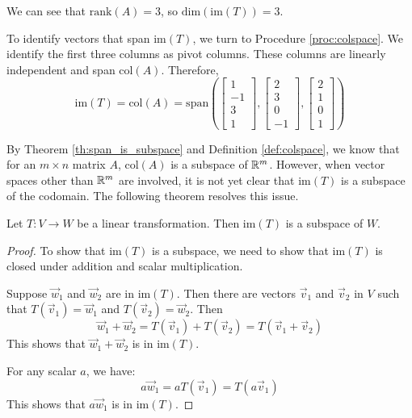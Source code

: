 \documentclass{ximera}
\begin{document}
\begin{example}
\begin{explanation}
We can see that $\mbox{rank}(A)=3$, so $\mbox{dim}(\mbox{im}(T))=3$. 
 
To identify vectors that span $\mbox{im}(T)$, we turn to Procedure \ref{proc:colspace}.  We identify the first three columns as pivot columns.  These columns are linearly independent and span $\mbox{col}(A)$.  Therefore,
$$\mbox{im}(T)=\mbox{col}(A)=\mbox{span}\left(\begin{bmatrix}1\\-1\\3\\1\end{bmatrix}, \begin{bmatrix}2\\3\\0\\-1\end{bmatrix}, \begin{bmatrix}2\\1\\0\\1\end{bmatrix}\right)$$
\end{explanation}
\end{example}

By Theorem \ref{th:span_is_subspace} and Definition \ref{def:colspace}, we know that for an $m\times n$ matrix $A$, $\mbox{col}(A)$ is a subspace of $\mathbb{R}^m$.  However, when vector spaces other than $\mathbb{R}^m$ are involved, it is not yet clear that $\mbox{im}(T)$ is a subspace of the codomain. The following theorem resolves this issue.
 
\begin{theorem}\label{th:imagesubspace}
Let $T:V\rightarrow W$ be a linear transformation.  Then $\mbox{im}(T)$ is a subspace of $W$.
\end{theorem}
\begin{proof}
To show that $\mbox{im}(T)$ is a subspace, we need to show that $\mbox{im}(T)$ is closed under addition and scalar multiplication.
 
Suppose $\vec{w}_1$ and $\vec{w}_2$ are in $\mbox{im}(T)$.  Then there are vectors $\vec{v}_1$ and $\vec{v}_2$ in $V$ such that $T(\vec{v}_1)=\vec{w}_1$ and $T(\vec{v}_2)=\vec{w}_2$.  Then
$$\vec{w}_1+\vec{w}_2=T(\vec{v}_1)+T(\vec{v}_2)=T(\vec{v}_1+\vec{v}_2)$$
This shows that $\vec{w}_1+\vec{w}_2$ is in $\mbox{im}(T)$.
 
For any scalar $a$, we have:
$$a\vec{w}_1=aT(\vec{v}_1)=T(a\vec{v}_1)$$
This shows that $a\vec{w}_1$ is in $\mbox{im}(T)$.
 
\end{proof}
 
\end{document}
